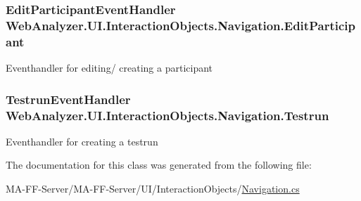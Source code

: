 \subsubsection[{Edit\+Participant}]{\setlength{\rightskip}{0pt plus 5cm}Edit\+Participant\+Event\+Handler Web\+Analyzer.\+U\+I.\+Interaction\+Objects.\+Navigation.\+Edit\+Participant}\label{class_web_analyzer_1_1_u_i_1_1_interaction_objects_1_1_navigation_adc0aa816457297571e9dd44ffe09a372}


Eventhandler for editing/ creating a participant 

\hypertarget{class_web_analyzer_1_1_u_i_1_1_interaction_objects_1_1_navigation_a34448e99688e6e15b470a981a86a4bba}{}
\subsubsection[{Testrun}]{\setlength{\rightskip}{0pt plus 5cm}Testrun\+Event\+Handler Web\+Analyzer.\+U\+I.\+Interaction\+Objects.\+Navigation.\+Testrun}\label{class_web_analyzer_1_1_u_i_1_1_interaction_objects_1_1_navigation_a34448e99688e6e15b470a981a86a4bba}


Eventhandler for creating a testrun 



The documentation for this class was generated from the following file\+:\begin{DoxyCompactItemize}
\item 
M\+A-\/\+F\+F-\/\+Server/\+M\+A-\/\+F\+F-\/\+Server/\+U\+I/\+Interaction\+Objects/\hyperlink{_navigation_8cs}{Navigation.\+cs}\end{DoxyCompactItemize}
